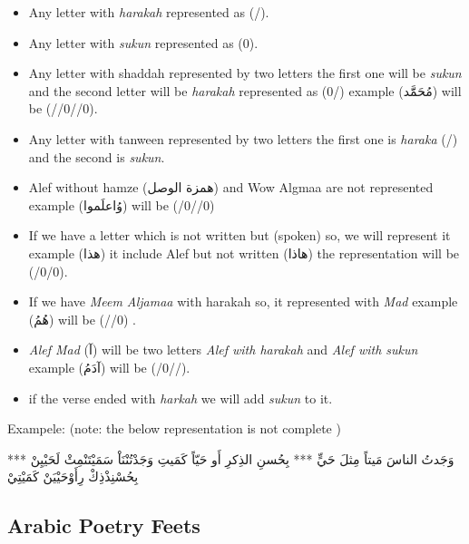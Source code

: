   \begin{itemize}
  \item Any letter with \textit{harakah} represented as (/).
  \item Any letter with \textit{sukun} represented as (0).
  \item Any letter with shaddah represented by two letters the first one will be \textit{sukun} and the second letter will be \textit{harakah} represented as (0/) example (\textarabic{مُحَمََّد}) will be (//0//0).
  \item Any letter with tanween represented by two letters the first one is \textit{haraka} (/) and the second is \textit{sukun}.
  \item Alef without hamze (\textarabic{همزة الوصل}) and Wow Algmaa are not represented example (\textarabic{وُاعلَموا}) will be (/0//0)
  \item If we have a letter which is not written but (spoken) so, we will represent it example (\textarabic{هذا}) it include Alef but not written (\textarabic{هاذا}) the representation will be (/0/0).
  \item If we have \textit{Meem Aljamaa} with harakah so, it represented with \textit{Mad} example (\textarabic{هُمُ}) will be (//0) .
  \item \textit{Alef Mad} (\textarabic{آ}) will be two letters \textit{Alef with harakah} and \textit{Alef with sukun} example (\textarabic{آدَمُ}) will be (/0//).
    \item if the verse ended with \textit{harkah} we will add \textit{sukun} to it.
    
    
    \end{itemize}
Exampele: (note: the below representation is not complete )
\begin{Arabic}
	\begin{traditionalpoem*}
وَجَدتُ الناسَ مَيتاً مِثلَ حَيٍّ *** بِحُسنِ الذِكرِ أَو حَيّاً كَمَيتِ
وَجَدْتُنْنَاْ سَمَيْتَنْمِثْ لَحَيْيِنْ *** بِحُسْنِذْذِكْ رِأَوْحَيْيَنْ كَمَيْتِيْ

	\end{traditionalpoem*}
\end{Arabic}
    
\newpage

\subsection{Arabic Poetry Feets}

